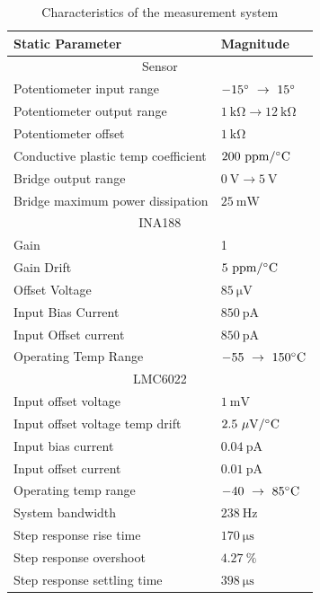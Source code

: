 \documentclass[10pt,twocolumn]{witseiepaper}
\begin{document}
\begin{table}[h!]
	\caption{Characteristics of the measurement system} \label{tab:static}
	\begin{tabular}{|p{}| p{}|}
		\hline
		\textbf{Static Parameter} & \textbf{Magnitude} \\ \hline
		\multicolumn{2}{|c|}{Sensor} \\ \hline
		Potentiometer input range & $-15^\circ~\rightarrow~15^\circ$\\
		Potentiometer output range & $\mathrm{1~k\Omega \rightarrow 12~k\Omega}$\\
		Potentiometer offset & $\mathrm{1~k\Omega}$\\
		Conductive plastic temp coefficient & $\mathrm{200~ppm/^\circ C}$ \\
		Bridge output range & $\mathrm{0~V \rightarrow 5~V}$\\
		Bridge maximum power dissipation & $\mathrm{25~mW}$ \\ \hline
		\multicolumn{2}{|c|}{INA188} \\ \hline
		Gain & 1\\
		Gain Drift & $\mathrm{5~ppm/^\circ C}$ \\
		Offset Voltage & $\mathrm{85~\mu V}$ \\
		Input Bias Current & $\mathrm{850~pA}$\\
		Input Offset current & $\mathrm{850~pA}$\\
		Operating Temp Range & $\mathrm{-55~\rightarrow~150^\circ C}$\\ \hline
		\multicolumn{2}{|c|}{LMC6022} \\ \hline
		Input offset voltage & $\mathrm{1~m V}$ \\
		Input offset voltage temp drift& $\mathrm{2.5~\mu V/ ^\circ C}$ \\
		Input bias current & $\mathrm{0.04~pA}$\\
		Input offset current & $\mathrm{0.01~pA}$\\
		Operating temp range & $\mathrm{-40~\rightarrow~85^\circ C}$\\ \hline
		System bandwidth & $238~\mathrm{Hz}$ \\
		Step response rise time & $170~\mathrm{\mu s}$ \\
		Step response overshoot & $4.27~\%$ \\
		Step response settling time & $398~\mathrm{\mu s}$ \\
		\hline
	\end{tabular}
\end{table}
\end{document}
